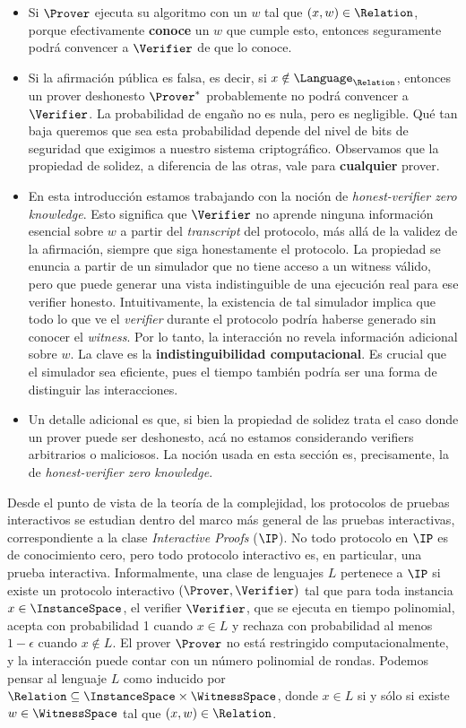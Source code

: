 \begin{itemize}[noitemsep]
	\item Si $\Prover$ ejecuta su algoritmo con un $w$ tal que $(x,w) \in \Relation$, porque efectivamente \textbf{conoce} un $w$ que cumple esto, entonces seguramente podrá convencer a $\Verifier$ de que lo conoce.
		\item Si la afirmación pública es falsa, es decir, si $x \notin \Language_\Relation$, entonces un prover deshonesto $\Prover^*$ probablemente no podrá convencer a $\Verifier$. La probabilidad de engaño no es nula, pero es negligible. Qué tan baja queremos que sea esta probabilidad depende del nivel de bits de seguridad que exigimos a nuestro sistema criptográfico. Observamos que la propiedad de solidez, a diferencia de las otras, vale para \textbf{cualquier} prover.
		\item En esta introducción estamos trabajando con la noción de \textit{honest-verifier zero knowledge}. Esto significa que $\Verifier$ no aprende ninguna información esencial sobre $w$ a partir del \textit{transcript} del protocolo, más allá de la validez de la afirmación, siempre que siga honestamente el protocolo. La propiedad se enuncia a partir de un simulador que no tiene acceso a un witness válido, pero que puede generar una vista indistinguible de una ejecución real para ese verifier honesto. Intuitivamente, la existencia de tal simulador implica que todo lo que ve el \textit{verifier} durante el protocolo podría haberse generado sin conocer el \textit{witness}. Por lo tanto, la interacción no revela información adicional sobre $w$. La clave es la \textbf{indistinguibilidad computacional}. Es crucial que el simulador sea eficiente, pues el tiempo también podría ser una forma de distinguir las interacciones.
		\item Un detalle adicional es que, si bien la propiedad de solidez trata el caso donde un prover puede ser deshonesto, acá no estamos considerando verifiers arbitrarios o maliciosos. La noción usada en esta sección es, precisamente, la de \textit{honest-verifier zero knowledge}.
\end{itemize}

Desde el punto de vista de la teoría de la complejidad, los protocolos de pruebas \ZK interactivos se estudian dentro del marco más general de las pruebas interactivas, correspondiente a la clase \textit{Interactive Proofs} ($\IP$). No todo protocolo en $\IP$ es de conocimiento cero, pero todo protocolo \ZK interactivo es, en particular, una prueba interactiva. Informalmente, una clase de lenguajes $L$ pertenece a $\IP$ si existe un protocolo interactivo $(\Prover, \Verifier)$ tal que para toda instancia $x \in \InstanceSpace$, el verifier $\Verifier$, que se ejecuta en tiempo polinomial, acepta con probabilidad 1 cuando $x \in L$ y rechaza con probabilidad al menos $1 - \epsilon$ cuando $x \notin L$. El prover $\Prover$ no está restringido computacionalmente, y la interacción puede contar con un número polinomial de rondas. Podemos pensar al lenguaje $L$ como inducido por $\Relation \subseteq \InstanceSpace \times \WitnessSpace$, donde $x \in L$ si y sólo si existe $w \in \WitnessSpace$ tal que $(x,w) \in \Relation$.

